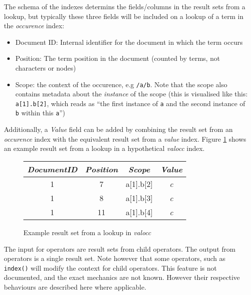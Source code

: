 The schema of the indexes determins the fields/columns in the result sets from
a lookup, but typically these three fields will be included on a lookup of a
term in the \textit{occurence} index:
\begin{itemize}
  \item Document ID: Internal identifier for the document in which the term
  occurs
  \item Position: The term position in the document (counted by terms, not
  characters or nodes)
  \item Scope: the context of the occurence, e.g \texttt{/a/b}. Note that the
  scope also contains metadata about the \textit{instance} of the scope (this
  is visualised like this: \texttt{a[1].b[2]}, which reads as ``the first
  instance of \texttt{a} and the second instance of \texttt{b} within this \texttt{a}'')
\end{itemize}
Additionally, a \textit{Value} field can be added by combining the result set
from an \textit{occurence} index with the equivalent result set from a \textit{value}
index. Figure \ref{table:method:mql:example_resultset} shows an example result
set from a lookup in a hypothetical \textit{valocc} index.

\begin{figure}[!htp]
\begin{center}

\begin{tabular}{| c | c | c | c |}
\hline
\textit{DocumentID} & \textit{Position} & \textit{Scope} & \textit{Value} \\
\hline
1 & 7 & \textsf{a[1].b[2]} & \emph{c} \\ 
\hline
1 & 8 & \textsf{a[1].b[3]} & \emph{c} \\
\hline
1 & 11 & \textsf{a[1].b[4]} & \emph{c} \\
\hline
\end{tabular}
\caption{Example result set from a lookup in \textit{valocc}}
\label{table:method:mql:example_resultset}
\end{center}
\end{figure}

The input for operators are result sets from child operators. The output from
operators is a single result set. Note however that some operators, such as
\texttt{index()} will modify the context for child operators. This feature is
not documented, and the exact mechanics are not known. However their respective
behaviours are described here where applicable.

